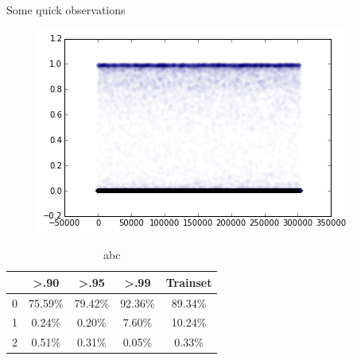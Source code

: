 \begin{frame}{Some quick observations}
	
	\begin{figure}[H]
		\centering
		\includegraphics[width=0.7\linewidth]{images/a.png}
	\end{figure}
	
	\begin{table}[h]
		\centering
			\begin{tabular}{|c|c|c|c|c|}
				\hline
				     & >.90        & >.95       & >.99 &  Trainset \\
				     \hline
				0   & 75.59\% & 79.42\% & 92.36\% & 89.34\% \\ 
				1   & 0.24\% & 0.20\% & 7.60\% & 10.24\% \\
				2   & 0.51\% & 0.31\% & 0.05\% & 0.33\% \\
				\hline
			\end{tabular}
			\caption{abc}
			\label{table:cnnbenchmark}
		\end{table}
	
\end{frame}




